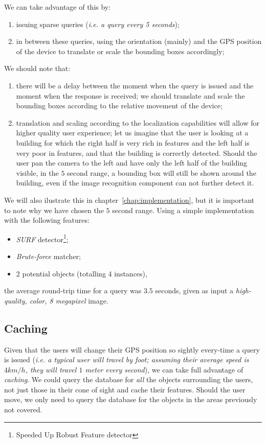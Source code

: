 \documentclass[a4paper,onecolumn,oneside,titlepage,11pt]{report}
\begin{document}
We can take advantage of this by:
\begin{enumerate}
	\item issuing sparse queries (\emph{i.e. a query every 5 seconds});
	\item in between these queries, using the orientation (mainly) and the GPS position of the device to translate or scale the bounding boxes accordingly;
\end{enumerate}
We should note that:
\begin{enumerate}
	\item there will be a delay between the moment when the query is issued and the moment when the response is received; we should translate and scale the bounding boxes according to the relative movement of the device;
	\item translation and scaling according to the localization capabilities will allow for higher quality user experience; let us imagine that the user is looking at a building for which the right half is very rich in features and the left half is very poor in features, and that the building is correctly detected. Should the user pan the camera to the left and have only the left half of the building visible, in the $5$ second range, a bounding box will still be shown around the building, even if the image recognition component can not further detect it.
\end{enumerate}
We will also ilustrate this in chapter~\ref{chap:implementation}, but it is important to note why we have chosen the $5$ second range. Using a simple implementation with the following features:
\begin{itemize}
	\item \emph{SURF} detector\footnote{Speeded Up Robust Feature detector};
	\item \emph{Brute-force} matcher;
	\item 2 potential objects (totalling 4 instances), 
\end{itemize}
the average round-trip time for a query was $3.5$ seconds, given as input a \emph{high-quality, color, 8 megapixel} image.

\subsection{Caching}
Given that the users will change their GPS position so sightly every-time a query is issued (\emph{i.e. a typical user will travel by foot; assuming their average speed is $4 km/h$, they will travel $1$ meter every second}), we can take full advantage of \emph{caching}. We could query the database for \emph{all} the objects surrounding  the users, not just those in their cone of sight and cache their features. Should the user move, we only need to query the database for the objects in the areas previously not covered.
\end{document}
